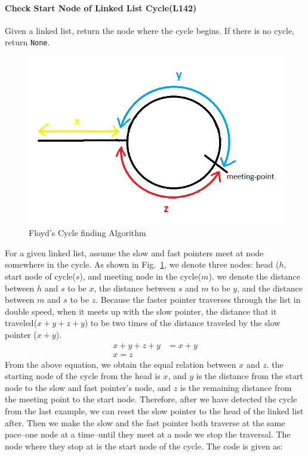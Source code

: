 \documentclass[../main.tex]{subfiles}
\begin{document}
\paragraph{Check Start Node of Linked List Cycle(L142)} Given a linked list, return the node where the cycle begins. If there is no cycle, return \texttt{None}.
\begin{figure}[h!]
    \centering
    \includegraphics[width=0.6\columnwidth]{fig/TQoyH.png}
    \caption{Floyd's Cycle finding Algorithm}
    \label{fig:floyd_cycle_1}
\end{figure}

For a given linked list, assume the slow and fast pointers meet at node somewhere in the cycle. As shown in Fig.~\ref{fig:floyd_cycle_1}, we denote  three nodes: head ($h$, start node of cycle($s$), and meeting node in the cycle($m$). we denote the distance between $h$ and $s$ to be $x$, the distance between $s$ and $m$ to be $y$, and the distance between $m$ and $s$ to be $z$.  Because the faster pointer traverses through the list in double speed, when it meets up with the slow pointer, the distance that it traveled($x+y+z+y$) to be two times of the distance traveled by the slow pointer ($x+y$).
\begin{align}
    x + y + z + y &= x + y \\
    x = z
\end{align}
From the above equation, we obtain the equal relation between $x$ and $z$. the starting node of the cycle from the head is $x$, and $y$ is the distance from the start node to the slow and fast pointer's node, and $z$ is the remaining distance from the meeting point to the start node.  Therefore, after we have detected the cycle from the last example, we can reset the slow pointer to the head of the linked list after. Then we make the slow and the fast pointer both traverse at the same pace--one node at a time--until they meet at a node we stop the traversal. The node where they stop at is the start node of the cycle. The code is given as:
\end{document}
